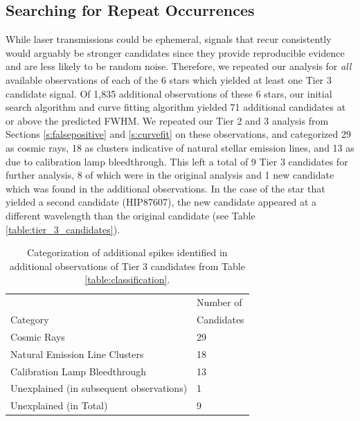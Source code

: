\documentclass[twocolumn]{aastex701}
\begin{document}
\subsection{Searching for Repeat Occurrences}
\label{s:repeat}
While laser transmissions could be ephemeral, signals that recur consistently would arguably be stronger candidates since they provide reproducible evidence and are less likely to be random noise.  Therefore, we repeated our analysis for {\em all} available observations of each of the 6 stars which yielded at least one Tier 3 candidate signal. Of 1,835 additional observations of these 6 stars, our initial search algorithm and curve fitting algorithm yielded 71 additional candidates at or above the predicted FWHM. We repeated our Tier 2 and 3 analysis from Sections \ref{s:falsepositive} and \ref{s:curvefit} on these observations, and categorized 29 as cosmic rays, 18 as clusters indicative of natural stellar emission lines, and 13 as due to calibration lamp bleedthrough. This left a total of 9 Tier 3 candidates for further analysis, 8 of which were in the original analysis and 1 new candidate which was found in the additional observations. In the case of the star that yielded a second candidate (HIP87607), the new candidate appeared at a different wavelength than the original candidate (see Table \ref{table:tier_3_candidates}).

\begin{table}
\begin{center}
\begin{tabular}{|l|l|} 
 \hline
 & Number of \\
 Category & Candidates \\ 
 \hline
 Cosmic Rays & 29 \\ 
 Natural Emission Line Clusters & 18 \\ 
 Calibration Lamp Bleedthrough &  13 \\ 
 Unexplained (in subsequent observations) & 1 \\
 Unexplained (in Total) & 9 \\
 \hline
 \end{tabular}
\end{center}

\caption{Categorization of additional spikes identified in additional observations of Tier 3 candidates from Table \ref{table:classification}.}
\label{table:followup}
\end{table}
\end{document}
